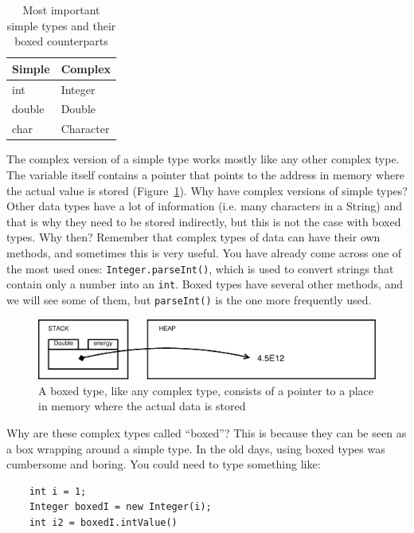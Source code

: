 \begin{table}[htbp]
  \centering
  \begin{tabular}{|l|l|}
    \hline
    Simple & Complex \\
    \hline
    \hline
    int & Integer \\
    double & Double \\
    char & Character \\
    \hline
  \end{tabular}
  \caption{Most important simple types and their boxed counterparts}
  \label{tab:jajksdfj}
\end{table}

The complex version of a simple type works mostly like any other
complex type. The variable itself contains a pointer that points to
the address in memory where the actual value is stored
(Figure~\ref{fig:doubled}). Why have 
complex versions of simple types? Other data types have a lot of
information (i.e. many characters in a String) and that is why they
need to be stored indirectly, but this is not the case with boxed
types. Why then? Remember that complex types of data
can have their own methods, and sometimes this is very useful. You
have already come across one of the most used ones: 
\verb+Integer.parseInt()+,
which is used to convert strings that contain only a number into an
\verb+int+. Boxed types have several other methods, and we will see
some of them, but \verb+parseInt()+ is the one more frequently used. 

\begin{figure}[htbp]
  \centering
  \includegraphics[width=\textwidth]{gfx/variables-double}
  \caption{A boxed type, like any complex type, consists of a pointer
    to a place in memory where the actual data is stored}
  \label{fig:doubled}
\end{figure}

Why are these complex types called ``boxed''? This is because they can
be seen as a box wrapping around a simple type. In the old days, using
boxed types was cumbersome and boring. You could need to type
something like:

\begin{verbatim}
    int i = 1;
    Integer boxedI = new Integer(i);
    int i2 = boxedI.intValue()
\end{verbatim}


